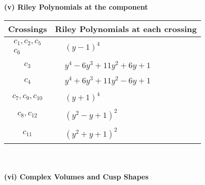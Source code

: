 \documentclass[1p]{elsarticle_modified}
\theoremstyle{definition}
\begin{document}
\newpage\renewcommand{\arraystretch}{1}
\flushleft \textbf{(v) Riley Polynomials at the component}\newline \\
\begin{tabular}{m{50pt}|m{274pt}}
Crossings & \hspace{64pt}Riley Polynomials at each crossing \\
\hline $$\begin{aligned}c_{1},c_{2},c_{5}\\c_{6}\end{aligned}$$&$\begin{aligned}
&(y-1)^4
\end{aligned}$\\
\hline $$\begin{aligned}c_{3}\end{aligned}$$&$\begin{aligned}
&y^4-6 y^3+11 y^2+6 y+1
\end{aligned}$\\
\hline $$\begin{aligned}c_{4}\end{aligned}$$&$\begin{aligned}
&y^4+6 y^3+11 y^2-6 y+1
\end{aligned}$\\
\hline $$\begin{aligned}c_{7},c_{9},c_{10}\end{aligned}$$&$\begin{aligned}
&(y+1)^4
\end{aligned}$\\
\hline $$\begin{aligned}c_{8},c_{12}\end{aligned}$$&$\begin{aligned}
&(y^2- y+1)^2
\end{aligned}$\\
\hline $$\begin{aligned}c_{11}\end{aligned}$$&$\begin{aligned}
&(y^2+y+1)^2
\end{aligned}$\\
\hline
\end{tabular}\\~\\
\newpage\flushleft \textbf{(vi) Complex Volumes and Cusp Shapes}
\end{document}

